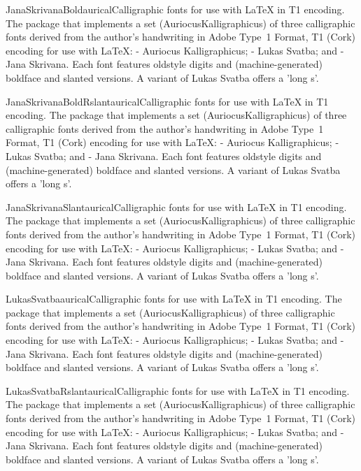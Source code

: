 \documentclass{ddltxtyp}
\begin{document}
\begin{package}{JanaSkrivanaBold}{aurical}{Calligraphic fonts for use with {\LaTeX} in T1 encoding.}
The package that implements a set (AuriocusKalligraphicus) of
three calligraphic fonts derived from the author's handwriting
in Adobe Type~1 Format, T1 (Cork) encoding for use with {\LaTeX}:
- Auriocus Kalligraphicus; - Lukas Svatba; and - Jana Skrivana.
Each font features oldstyle digits and (machine-generated)
boldface and slanted versions. A variant of Lukas Svatba offers
a 'long s'.
\end{package}
\begin{package}{JanaSkrivanaBoldRslant}{aurical}{Calligraphic fonts for use with {\LaTeX} in T1 encoding.}
The package that implements a set (AuriocusKalligraphicus) of
three calligraphic fonts derived from the author's handwriting
in Adobe Type~1 Format, T1 (Cork) encoding for use with {\LaTeX}:
- Auriocus Kalligraphicus; - Lukas Svatba; and - Jana Skrivana.
Each font features oldstyle digits and (machine-generated)
boldface and slanted versions. A variant of Lukas Svatba offers
a 'long s'.
\end{package}
\begin{package}{JanaSkrivanaSlant}{aurical}{Calligraphic fonts for use with {\LaTeX} in T1 encoding.}
The package that implements a set (AuriocusKalligraphicus) of
three calligraphic fonts derived from the author's handwriting
in Adobe Type~1 Format, T1 (Cork) encoding for use with {\LaTeX}:
- Auriocus Kalligraphicus; - Lukas Svatba; and - Jana Skrivana.
Each font features oldstyle digits and (machine-generated)
boldface and slanted versions. A variant of Lukas Svatba offers
a 'long s'.
\end{package}
\begin{package}{LukasSvatba}{aurical}{Calligraphic fonts for use with {\LaTeX} in T1 encoding.}
The package that implements a set (AuriocusKalligraphicus) of
three calligraphic fonts derived from the author's handwriting
in Adobe Type~1 Format, T1 (Cork) encoding for use with {\LaTeX}:
- Auriocus Kalligraphicus; - Lukas Svatba; and - Jana Skrivana.
Each font features oldstyle digits and (machine-generated)
boldface and slanted versions. A variant of Lukas Svatba offers
a 'long s'.
\end{package}
\begin{package}{LukasSvatbaRslant}{aurical}{Calligraphic fonts for use with {\LaTeX} in T1 encoding.}
The package that implements a set (AuriocusKalligraphicus) of
three calligraphic fonts derived from the author's handwriting
in Adobe Type~1 Format, T1 (Cork) encoding for use with {\LaTeX}:
- Auriocus Kalligraphicus; - Lukas Svatba; and - Jana Skrivana.
Each font features oldstyle digits and (machine-generated)
boldface and slanted versions. A variant of Lukas Svatba offers
a 'long s'.
\end{package}
\end{document}
